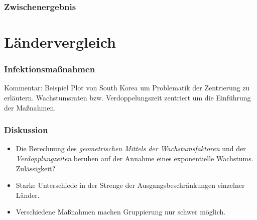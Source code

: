 \documentclass{beamer}
\begin{document}
 \begin{frame}
 	\frametitle{Zwischenergebnis}
 \end{frame}

\section{Ländervergleich}
\begin{frame}
	\frametitle{Infektionsmaßnahmen}
	Kommentar: Beispiel Plot von South Korea um Problematik der Zentrierung zu erläutern. Wachstumsraten bzw. Verdoppelungszeit zentriert um die Einführung der Maßnahmen.
\end{frame}

\begin{frame}
	\frametitle{Diskussion}
	\begin{itemize}
		\item Die Berechnung des \emph{geometrischen Mittels der Wachstumsfaktoren} und der \emph{Verdopplungzeiten} beruhen auf der Annahme eines exponentielle Wachstums. Zulässigkeit?
		\item Starke Unterschiede in der Strenge der Ausgangsbeschränkungen einzelner Länder.
		\item Verschiedene Maßnahmen machen Gruppierung nur schwer möglich.
	\end{itemize}
\end{frame}
 
\end{document}
